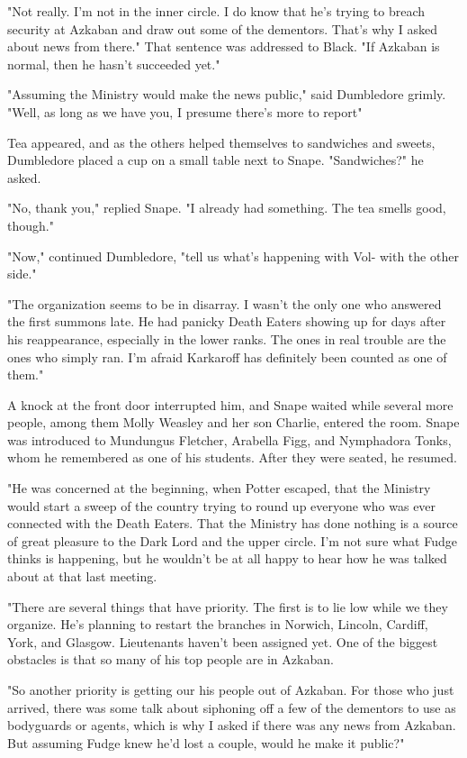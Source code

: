 "Not really. I'm not in the inner circle. I do know that he's trying to breach security at Azkaban and draw out some of the dementors. That's why I asked about news from there." That sentence was addressed to Black. "If Azkaban is normal, then he hasn't succeeded yet."

"Assuming the Ministry would make the news public," said Dumbledore grimly. "Well, as long as we have you, I presume there's more to report{\el}"

Tea appeared, and as the others helped themselves to sandwiches and sweets, Dumbledore placed a cup on a small table next to Snape. "Sandwiches?" he asked.

"No, thank you," replied Snape. "I already had something. The tea smells good, though."

"Now," continued Dumbledore, "tell us what's happening with Vol-{\el} with the other side."

"The organization seems to be in disarray. I wasn't the only one who answered the first summons late. He had panicky Death Eaters showing up for days after his reappearance, especially in the lower ranks. The ones in real trouble are the ones who simply ran. I'm afraid Karkaroff has definitely been counted as one of them."

A knock at the front door interrupted him, and Snape waited while several more people, among them Molly Weasley and her son Charlie, entered the room. Snape was introduced to Mundungus Fletcher, Arabella Figg, and Nymphadora Tonks, whom he remembered as one of his students. After they were seated, he resumed.

"He was concerned at the beginning, when Potter escaped, that the Ministry would start a sweep of the country trying to round up everyone who was ever connected with the Death Eaters. That the Ministry has done nothing is a source of great pleasure to the Dark Lord and the upper circle. I'm not sure what Fudge thinks is happening, but he wouldn't be at all happy to hear how he was talked about at that last meeting.

"There are several things that have priority. The first is to lie low while we{\el} they organize. He's planning to restart the branches in Norwich, Lincoln, Cardiff, York, and Glasgow. Lieutenants haven't been assigned yet. One of the biggest obstacles is that so many of his top people are in Azkaban.

"So another priority is getting our{\el} his people out of Azkaban. For those who just arrived, there was some talk about siphoning off a few of the dementors to use as bodyguards or agents, which is why I asked if there was any news from Azkaban. But assuming Fudge knew he'd lost a couple, would he make it public?"

